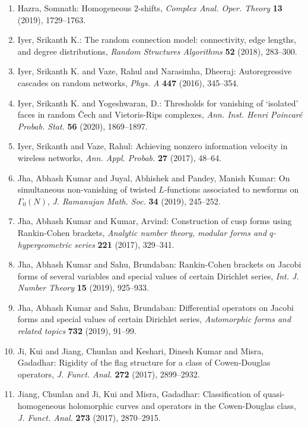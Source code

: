 \begin{enumerate}
{H}eisenberg groups, \emph{J. Pure Appl. Algebra} {\bf 225} (2021), Paper No. 106742, 16.
\item Hazra, Somnath: Homogeneous 2-shifts, \emph{Complex Anal. Oper. Theory} {\bf 13} (2019), 1729--1763.
\item Iyer, Srikanth K.: The random connection model: connectivity, edge lengths, and
degree distributions, \emph{Random Structures Algorithms} {\bf 52} (2018), 283--300.
\item Iyer, Srikanth K. and Vaze, Rahul and Narasimha, Dheeraj: Autoregressive cascades on random networks, \emph{Phys. A} {\bf 447} (2016), 345--354.
\item Iyer, Srikanth K. and Yogeshwaran, D.: Thresholds for vanishing of `isolated' faces in random \v{C}ech
and {V}ietoris-{R}ips complexes, \emph{Ann. Inst. Henri Poincar\'{e} Probab. Stat.} {\bf 56} (2020), 1869--1897.
\item Iyer, Srikanth and Vaze, Rahul: Achieving nonzero information velocity in wireless networks, \emph{Ann. Appl. Probab.} {\bf 27} (2017), 48--64.
\item Jha, Abhash Kumar and Juyal, Abhishek and Pandey, Manish
Kumar: On simultaneous non-vanishing of twisted {$L$}-functions
associated to newforms on {$\Gamma_0(N)$}, \emph{J. Ramanujan Math. Soc.} {\bf 34} (2019), 245--252.
\item Jha, Abhash Kumar and Kumar, Arvind: Construction of cusp forms using {R}ankin-{C}ohen brackets, \emph{Analytic number theory, modular forms and {$q$}-hypergeometric
series} {\bf 221} (2017), 329--341.
\item Jha, Abhash Kumar and Sahu, Brundaban: Rankin-{C}ohen brackets on {J}acobi forms of several variables
and special values of certain {D}irichlet series, \emph{Int. J. Number Theory} {\bf 15} (2019), 925--933.
\item Jha, Abhash Kumar and Sahu, Brundaban: Differential operators on {J}acobi forms and special values of
certain {D}irichlet series, \emph{Automorphic forms and related topics} {\bf 732} (2019), 91--99.
\item Ji, Kui and Jiang, Chunlan and Keshari, Dinesh Kumar and
Misra, Gadadhar: Rigidity of the flag structure for a class of
{C}owen-{D}ouglas operators, \emph{J. Funct. Anal.} {\bf 272} (2017), 2899--2932.
\item Jiang, Chunlan and Ji, Kui and Misra, Gadadhar: Classification of quasi-homogeneous holomorphic curves and
operators in the {C}owen-{D}ouglas class, \emph{J. Funct. Anal.} {\bf 273} (2017), 2870--2915.

\end{enumerate}
